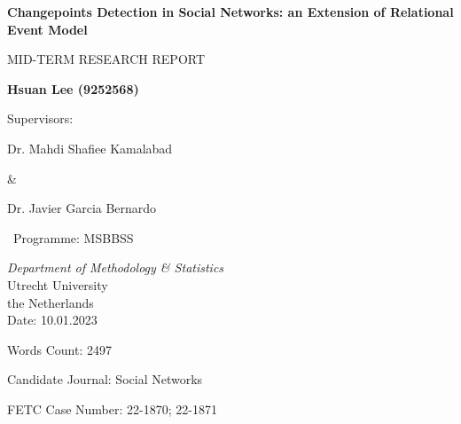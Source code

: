 \documentclass[]{interact}
\theoremstyle{plain}%
\theoremstyle{definition}
\theoremstyle{remark}
\begin{document}
	
	\begin{titlepage}
		\begin{center}
			\vspace*{0.3cm}
			
			\Huge
			\textbf{Changepoints Detection in Social Networks: an Extension of Relational Event Model}
			
			\vspace{1.8cm}
			\LARGE
			MID-TERM RESEARCH REPORT
			
			\vspace{1.8cm}
			
			\textbf{Hsuan Lee (9252568)}
			
			\vspace{1cm}
			Supervisors: 
			
			\vspace{0.5cm}
			
			Dr. Mahdi Shafiee Kamalabad 
			
			\& 
			
			Dr. Javier Garcia Bernardo
			
			\vspace{2cm}
			\Large
			
			\ Programme: MSBBSS
			
			\vspace{0.3cm}
			
			\emph{Department of Methodology \& Statistics}\\
			
			\vspace{0.3cm}
			Utrecht University\\
			the Netherlands\\
			
			\vspace{1.5cm}    
			\Large
			Date: 10.01.2023
			
			Words Count: 2497
			
			Candidate Journal: Social Networks
			
			FETC Case Number: 22-1870; 22-1871
		
		\end{center}
	\end{titlepage}
	
	
	\vspace*{1cm}
	 \\
\end{document}
